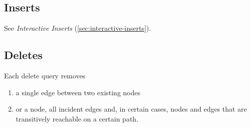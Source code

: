 \subsection{Inserts}
\label{sec:bi-inserts}

See \emph{Interactive Inserts} (\autoref{sec:interactive-inserts}).

\subsection{Deletes}
\label{sec:bi-deletes}

Each delete query removes

\begin{enumerate}
    \item a single edge between two existing nodes
    \item or a node, all incident edges and, in certain cases, nodes and edges that are transitively reachable on a certain path.
\end{enumerate}


